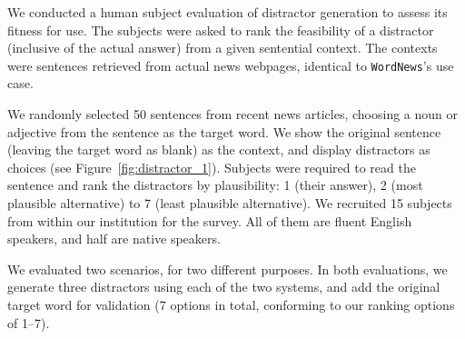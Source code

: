 



We conducted a human subject evaluation of distractor generation to
assess its fitness for use.  The subjects were asked to rank the
feasibility of a distractor (inclusive of the actual answer) from a
given sentential context.  The contexts were sentences retrieved from
actual news webpages, identical to {\tt WordNews}'s use case.

We randomly selected 50 sentences from recent news articles, choosing
a noun or adjective from the sentence as the target word. We show the
original sentence (leaving the target word as blank) as the context,
and display distractors as choices (see
Figure~\ref{fig:distractor_1}). Subjects were required to read the
sentence and rank the distractors by plausibility: 1 (their answer), 2
(most plausible alternative) to 7 (least plausible alternative).
We recruited 15 subjects from within our institution for the survey. 
All of them are fluent English speakers, and half are native speakers.  
 
We evaluated two scenarios, for two different purposes. In both
evaluations, we generate three distractors using each of the two systems,
and add the original target word for validation (7 options in total,
conforming to our ranking options of 1--7).

